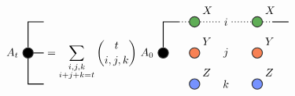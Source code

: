 \renewcommand{\graphTensorSpacing}{1.1}
\renewcommand{\graphTensorTwoStart}{2.25*\graphTensorSpacing}
\[
\begin{tikzpicture}[baseline=-0.65ex]
	\node[circle,draw=black!80,thick,fill=black,label=left:$A_{t}$] (ATT) at (0,0) {};

	\draw[thick, draw=black] (ATT) -- (0,2*\graphLineSpacing) -- (\graphLineSpacing,2*\graphLineSpacing) {};
	\draw[thick, draw=black] (ATT) -- (\graphLineSpacing,0) {};
	\draw[thick, draw=black] (ATT) -- (0,-2*\graphLineSpacing) -- (\graphLineSpacing,-2*\graphLineSpacing) {};
\end{tikzpicture}
=
\sum_{\substack{i,j,k\\ i+j+k=t}}
{t \choose {i,j,k}}
\begin{tikzpicture}[baseline=-0.65ex]
	\node[circle,draw=black!80,thick,fill=black,label=left:$A_{0}$] (AT) at (\graphTensorTwoStart,0) {};
	\node[circle,draw=black!80,thick,fill=myGreen,label=above right:$X$] (X) at (\graphTensorTwoStart + 2*\graphLineSpacing,2*\graphLineSpacing) {};
	\node[circle,draw=black!80,thick,fill=myGreen,label=above right:$X$] (X1) at (\graphTensorTwoStart + 6*\graphLineSpacing,2*\graphLineSpacing) {};
	\node[circle,draw=black!80,thick,fill=myOrange,label=above right:$Y$] (Y) at (\graphTensorTwoStart + 2*\graphLineSpacing,0) {};
	\node[circle,draw=black!80,thick,fill=myOrange,label=above right:$Y$] (Y1) at (\graphTensorTwoStart + 6*\graphLineSpacing,0) {};
	\node[circle,draw=black!80,thick,fill=myBlue,label=above right:$Z$] (Z) at (\graphTensorTwoStart + 2*\graphLineSpacing,-2*\graphLineSpacing) {};
	\node[circle,draw=black!80,thick,fill=myBlue,label=above right:$Z$] (Z1) at (\graphTensorTwoStart + 6*\graphLineSpacing,-2*\graphLineSpacing) {};

	\node (i) at (\graphTensorTwoStart + 4*\graphLineSpacing,2*\graphLineSpacing) {$i$};
	\node (j) at (\graphTensorTwoStart + 4*\graphLineSpacing,0) {$j$};
	\node (k) at (\graphTensorTwoStart + 4*\graphLineSpacing,-2*\graphLineSpacing) {$k$};
	
	\draw[thick, draw=black] (AT) -- (\graphTensorTwoStart,2*\graphLineSpacing) -- (\graphTensorTwoStart + \graphLineSpacing,2*\graphLineSpacing) ;
	\draw[thick, dotted] (\graphTensorTwoStart + \graphLineSpacing,2*\graphLineSpacing) -- (X) -- (i) -- (X1) -- (\graphTensorTwoStart + 7*\graphLineSpacing,2*\graphLineSpacing) {};
	\draw[thick, draw=black] (\graphTensorTwoStart + 7*\graphLineSpacing,2*\graphLineSpacing) -- (\graphTensorTwoStart + 8*\graphLineSpacing,2*\graphLineSpacing) {};


\end{tikzpicture}\]
